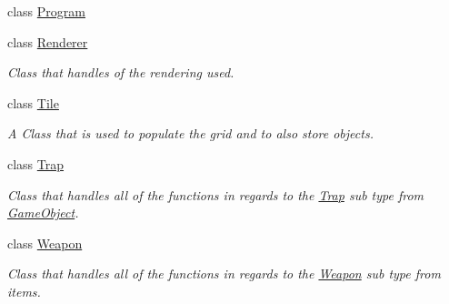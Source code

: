 \begin{DoxyCompactItemize}
class \mbox{\hyperlink{class_roguelike_r_p_g_1_1_program}{Program}}
\item 
class \mbox{\hyperlink{class_roguelike_r_p_g_1_1_renderer}{Renderer}}
\begin{DoxyCompactList}\small\item\em Class that handles of the rendering used. \end{DoxyCompactList}\item 
class \mbox{\hyperlink{class_roguelike_r_p_g_1_1_tile}{Tile}}
\begin{DoxyCompactList}\small\item\em A Class that is used to populate the grid and to also store objects. \end{DoxyCompactList}\item 
class \mbox{\hyperlink{class_roguelike_r_p_g_1_1_trap}{Trap}}
\begin{DoxyCompactList}\small\item\em Class that handles all of the functions in regards to the \mbox{\hyperlink{class_roguelike_r_p_g_1_1_trap}{Trap}} sub type from \mbox{\hyperlink{class_roguelike_r_p_g_1_1_game_object}{Game\+Object}}. \end{DoxyCompactList}\item 
class \mbox{\hyperlink{class_roguelike_r_p_g_1_1_weapon}{Weapon}}
\begin{DoxyCompactList}\small\item\em Class that handles all of the functions in regards to the \mbox{\hyperlink{class_roguelike_r_p_g_1_1_weapon}{Weapon}} sub type from items. \end{DoxyCompactList}\end{DoxyCompactItemize}
